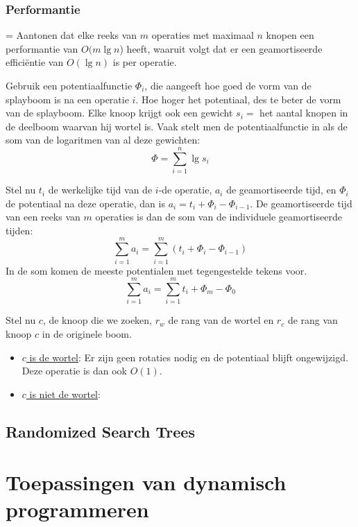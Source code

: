 \documentclass{report}
\begin{document}
	\subsection{Performantie}
	= Aantonen dat elke reeks van $m$ operaties met maximaal $n$ knopen een performantie van $O(m\lg n$) heeft, waaruit volgt dat er een geamortiseerde efficiëntie van $O(\lg n)$ is per operatie.

	Gebruik een potentiaalfunctie $\Phi_i$, die aangeeft hoe goed de vorm van de splayboom is na een operatie $i$. Hoe hoger het potentiaal, des te beter de vorm van de splayboom. Elke knoop krijgt ook een gewicht $s_i = $ het aantal knopen in de deelboom waarvan hij wortel is. Vaak stelt men de potentiaalfunctie in als de som van de logaritmen van al deze gewichten:
	$$\Phi = \sum_{i = 1}^{n} \lg s_i$$

	Stel nu $t_i$ de werkelijke tijd van de $i$-de operatie, $a_i$ de geamortiseerde tijd, en $\Phi_i$ de potentiaal na deze operatie, dan is $a_i = t_i + \Phi_i - \Phi_{i - 1}$. De geamortiseerde tijd van een reeks van $m$ operaties is dan de som van de individuele geamortiseerde tijden:
	$$\sum_{i = 1}^{m} a_i = \sum_{i = 1}^{m} (t_i + \Phi_i - \Phi_{i - 1})$$
	In de som komen de meeste potentialen met tegengestelde tekens voor.
	$$\sum_{i = 1}^{m} a_i = \sum_{i = 1}^{m} t_i + \Phi_m - \Phi_0$$

	Stel nu $c$, de knoop die we zoeken, $r_w$ de rang van de wortel en $r_c$ de rang van knoop $c$ in de originele boom.
	\begin{itemize}
		\item \underline{$c$ is de wortel}: Er zijn geen rotaties nodig en de potentiaal blijft ongewijzigd. Deze operatie is dan ook $O(1)$.
		\item \underline{$c$ is niet de wortel}: 
	\end{itemize}



	\section{Randomized Search Trees}
	\chapter{Toepassingen van dynamisch programmeren}
\end{document}
